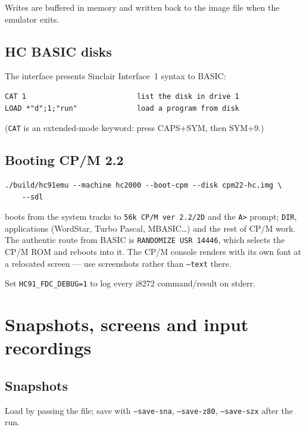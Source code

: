 \documentclass[11pt,a4paper]{article}
\newcommand{\opt}[1]{\texttt{#1}}
\begin{document}
Writes are buffered in memory and written back to the image file when
the emulator exits.

\subsection{HC BASIC disks}

The interface presents Sinclair Interface~1 syntax to BASIC:

\begin{Verbatim}
CAT 1                          list the disk in drive 1
LOAD *"d";1;"run"              load a program from disk
\end{Verbatim}

(\texttt{CAT} is an extended-mode keyword: press CAPS+SYM, then
SYM+9.)

\subsection{Booting CP/M 2.2}

\begin{Verbatim}
./build/hc91emu --machine hc2000 --boot-cpm --disk cpm22-hc.img \
    --sdl
\end{Verbatim}

boots from the system tracks to \texttt{56k CP/M ver 2.2/2D} and the
\texttt{A>} prompt; \texttt{DIR}, applications (WordStar, Turbo
Pascal, MBASIC\dots) and the rest of CP/M work. The authentic route
from BASIC is \texttt{RANDOMIZE USR 14446}, which selects the CP/M
ROM and reboots into it. The CP/M console renders with its own font at
a relocated screen --- use screenshots rather than \opt{--text} there.

Set \texttt{HC91\_FDC\_DEBUG=1} to log every i8272 command/result on
stderr.

\section{Snapshots, screens and input recordings}

\subsection{Snapshots}

Load by passing the file; save with \opt{--save-sna},
\opt{--save-z80}, \opt{--save-szx} after the run.
\end{document}
